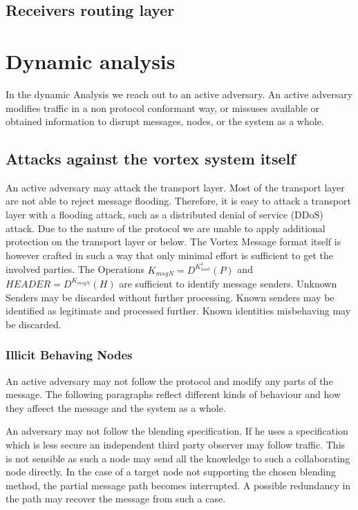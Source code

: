 \section{Receivers routing layer}

\chapter{Dynamic analysis}
In the dynamic Analysis we reach out to an active adversary. An active adversary modifies traffic in a non protocol conformant way, or missuses available or obtained information to disrupt messages, nodes, or the system as a whole.

\section{Attacks against the vortex system itself}
An active adversary may attack the transport layer. Most of the transport layer are not able to reject message flooding. Therefore, it is easy to attack a transport layer with a flooding attack, such as a distributed denial of service (DDoS) attack. Due to the nature of the protocol we are unable to apply additional protection on the transport layer or below. The Vortex Message format itself is however crafted in such a way that only minimal effort is sufficient to get the involved parties. The Operations $ K_{msgN}=D^{K^{1}_{host}}\left(P\right)$ and $HEADER=D^{K_{msgN}}\left(H\right)$ are sufficient to identify message senders. Unknown Senders may be discarded without further processing. Known senders may be identified as legitimate and processed further. Known identities misbehaving may be discarded.

\subsection{Illicit Behaving Nodes}
An active adversary may not follow the protocol and modify any parts of the message. The following paragraphs reflect different kinds of behaviour and how they affeect the message and the system as a whole.

An adversary may not follow the blending specification. If he uses a specification which is less secure an independent third party observer may follow traffic. This is not sensible as such a node may send all the knowledge to such a collaborating node directly. In the case of a  target node not supporting the chosen blending method, the partial message path becomes interrupted. A possible redundancy in the path may recover the message from such a case.

